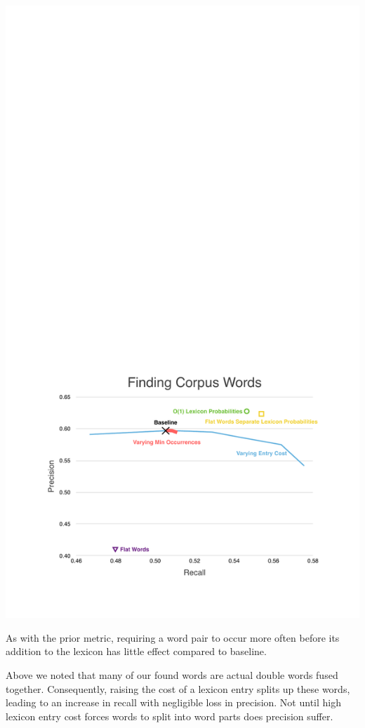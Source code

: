 \documentclass[11pt, oneside, fleqn]{article}
\begin{document}
  \includegraphics[scale=0.9]{./figure/finding_corpus_word.pdf}
 
    As with the prior metric, requiring a word pair to occur more often before its addition to the lexicon has little effect compared to baseline.

	Above we noted that many of our found words are actual double words fused together. Consequently, raising the cost of a lexicon entry splits up these words, leading to an increase in recall with negligible loss in precision. Not until high lexicon entry cost forces words to split into word parts does precision suffer.
\end{document}
